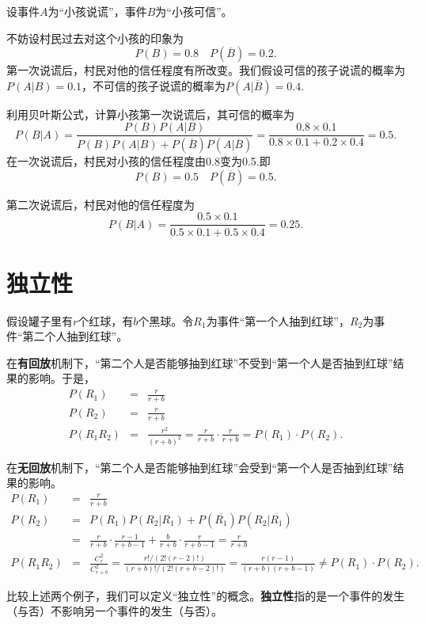\begin{example}[（狼来了）]
设事件$A$为“小孩说谎”，事件$B$为“小孩可信”。

不妨设村民过去对这个小孩的印象为$$P(B)=0.8 \quad P(\overline{B} )=0.2.$$
第一次说谎后，村民对他的信任程度有所改变。我们假设可信的孩子说谎的概率为$P(A|B)=0.1$，不可信的孩子说谎的概率为$P(A|\overline{B})=0.4$.

利用贝叶斯公式，计算小孩第一次说谎后，其可信的概率为$$P(B|A)=\frac{P(B)P(A|B)}{P(B)P(A|B)+P(\overline{B} )P(A|\overline{B})} =\frac{0.8\times 0.1}{0.8\times 0.1+0.2\times 0.4}=0.5.$$
在一次说谎后，村民对小孩的信任程度由0.8变为0.5.即$$P(B)=0.5 \quad P(\overline{B} )=0.5.$$

第二次说谎后，村民对他的信任程度为$$P(B|A)=\frac{0.5\times 0.1}{0.5\times 0.1+0.5\times 0.4}=0.25.$$
\end{example}
\section{独立性}
\begin{example} 假设罐子里有$r$个红球，有$b$个黑球。令$R_1$为事件“第一个人抽到红球”，$R_2$为事件“第二个人抽到红球”。

在\textbf{有回放}机制下，“第二个人是否能够抽到红球”不受到“第一个人是否抽到红球”结果的影响。于是，
\begin{eqnarray*}
    P(R_1) &=& \frac{r}{r+b}\\
    P(R_2) &=& \frac{r}{r+b}\\
    P(R_1R_2) &=& \frac{r^2}{(r+b)^2} = \frac{r}{r+b} \cdot \frac{r}{r+b}  = P(R_1)\cdot P(R_2). 
\end{eqnarray*}


在\textbf{无回放}机制下，“第二个人是否能够抽到红球”会受到“第一个人是否抽到红球”结果的影响。
\begin{eqnarray*}
    P(R_1) &=& \frac{r}{r+b}\\
    P(R_2) &=& P(R_1) P(R_2|R_1) + P(\overline{R_1}) P(R_2|\overline{R_1}) \\
    & = & \frac{r}{r+b} \cdot \frac{r-1}{r+b-1} + \frac{b}{r+b}\cdot \frac{r}{r+b-1} = \frac{r}{r+b}\\
    P(R_1R_2) &=& \frac{C_r^2}{C_{r+b}^2} = \frac{r!/(2!(r-2)!)}{(r+b)!/(2!(r+b-2)!)} = \frac{r(r-1)}{(r+b)(r+b-1)}\neq P(R_1)\cdot P(R_2). 
\end{eqnarray*}
\end{example}

比较上述两个例子，我们可以定义“独立性”的概念。\textbf{独立性}指的是一个事件的发生（与否）不影响另一个事件的发生（与否）。


